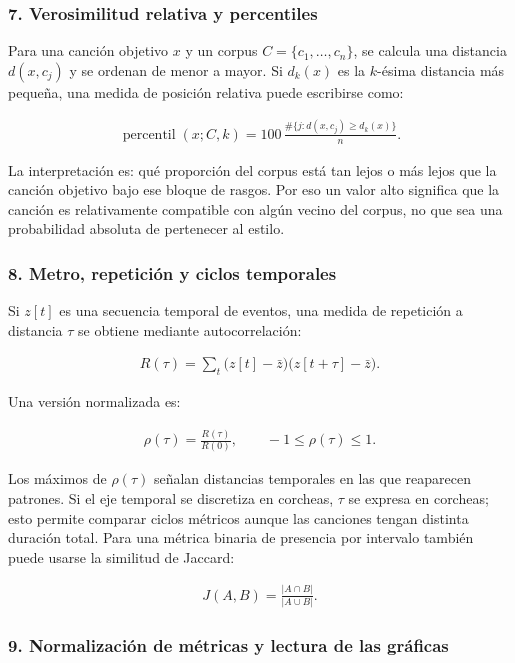 \documentclass[11pt, a4paper]{article}
\begin{document}
\subsubsection*{7. Verosimilitud relativa y percentiles}

Para una canción objetivo $x$ y un corpus $C=\{c_1,\ldots,c_n\}$, se calcula una distancia $d(x,c_j)$ y se ordenan de menor a mayor. Si $d_k(x)$ es la $k$-ésima distancia más pequeña, una medida de posición relativa puede escribirse como:

\begin{align}
\operatorname{percentil}(x;C,k)=100\,\frac{\#\{j:d(x,c_j)\geq d_k(x)\}}{n}.
\end{align}

La interpretación es: qué proporción del corpus está tan lejos o más lejos que la canción objetivo bajo ese bloque de rasgos. Por eso un valor alto significa que la canción es relativamente compatible con algún vecino del corpus, no que sea una probabilidad absoluta de pertenecer al estilo.

\subsubsection*{8. Metro, repetición y ciclos temporales}

Si $z[t]$ es una secuencia temporal de eventos, una medida de repetición a distancia $\tau$ se obtiene mediante autocorrelación:

\begin{align}
R(\tau)=\sum_t\bigl(z[t]-\bar z\bigr)\bigl(z[t+\tau]-\bar z\bigr).
\end{align}

Una versión normalizada es:

\begin{align}
\rho(\tau)=\frac{R(\tau)}{R(0)}, \qquad -1\leq\rho(\tau)\leq1.
\end{align}

Los máximos de $\rho(\tau)$ señalan distancias temporales en las que reaparecen patrones. Si el eje temporal se discretiza en corcheas, $\tau$ se expresa en corcheas; esto permite comparar ciclos métricos aunque las canciones tengan distinta duración total. Para una métrica binaria de presencia por intervalo también puede usarse la similitud de Jaccard:

\begin{align}
J(A,B)=\frac{|A\cap B|}{|A\cup B|}.
\end{align}

\subsubsection*{9. Normalización de métricas y lectura de las gráficas}
\end{document}

